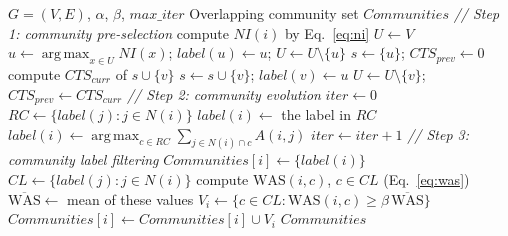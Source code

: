 \documentclass[conference]{IEEEtran}
\newcommand{\algcomment}[1]{\Statex \textit{// #1}}
\DeclareMathOperator*{\argmax}{arg\,max}
\begin{document}
\begin{algorithm}[t]
\footnotesize
\caption{TPOC-LPA (baseline, after~\cite{kong2026})}\label{alg:base}
\begin{algorithmic}[1]
\Require $G=(V,E)$, $\alpha$, $\beta$, $max\_iter$
\Ensure Overlapping community set $Communities$
\algcomment{Step 1: community pre-selection}
 compute $NI(i)$ by Eq.~\eqref{eq:ni} \EndFor
\State $U\gets V$
  \State $u\gets\argmax_{x\in U}NI(x)$; $label(u)\gets u$; $U\gets U\setminus\{u\}$
  \State $s\gets\{u\}$; $CTS_{prev}\gets0$
    \State compute $CTS_{curr}$ of $s\cup\{v\}$
      \State $s\gets s\cup\{v\}$; $label(v)\gets u$
      \State $U\gets U\setminus\{v\}$; $CTS_{prev}\gets CTS_{curr}$
    \EndIf
  \EndFor
\EndWhile
\algcomment{Step 2: community evolution}
\State $iter\gets0$
\Repeat
    \State $RC\gets\{label(j):j\in N(i)\}$
     \State $label(i)\gets$ the label in $RC$
    \Else \State $label(i)\gets\argmax_{c\in RC}\sum_{j\in N(i)\cap c}A(i,j)$
    \EndIf
  \EndFor
  \State $iter\gets iter+1$
\algcomment{Step 3: community label filtering}
 $Communities[i]\gets\{label(i)\}$ \EndFor
{}
  \State $CL\gets\{label(j):j\in N(i)\}$
    \State compute $\mathrm{WAS}(i,c)$, $c\in CL$ (Eq.~\eqref{eq:was})
    \State $\overline{\mathrm{WAS}}\gets$ mean of these values
    \State $V_i\gets\{c\in CL:\mathrm{WAS}(i,c)\ge\beta\,\overline{\mathrm{WAS}}\}$
    \State $Communities[i]\gets Communities[i]\cup V_i$
  \EndIf
\EndFor
\State \Return $Communities$
\end{algorithmic}
\end{algorithm}
\end{document}
